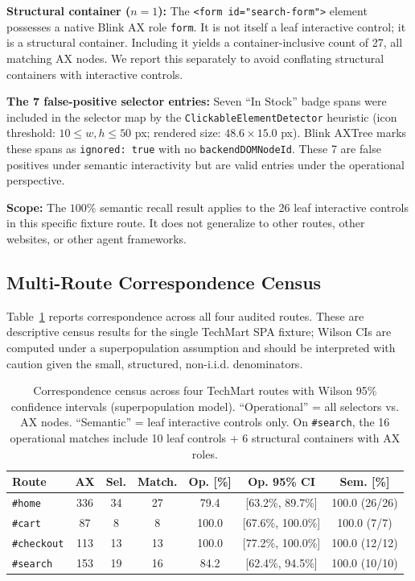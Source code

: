 \documentclass[conference]{IEEEtran}
\begin{document}
\textbf{Structural container ($n=1$):} The \texttt{<form id="search-form">} element possesses a native Blink AX role \texttt{form}. It is not itself a leaf interactive control; it is a structural container. Including it yields a container-inclusive count of 27, all matching AX nodes. We report this separately to avoid conflating structural containers with interactive controls.

\textbf{The 7 false-positive selector entries:} Seven ``In Stock'' badge spans were included in the selector map by the \texttt{ClickableElementDetector} heuristic (icon threshold: $10 \leq w, h \leq 50$ px; rendered size: $48.6 \times 15.0$ px). Blink AXTree marks these spans as \texttt{ignored: true} with no \texttt{backendDOMNodeId}. These 7 are false positives under semantic interactivity but are valid entries under the operational perspective.

\textbf{Scope:} The $100\%$ semantic recall result applies to the 26 leaf interactive controls in this specific fixture route. It does not generalize to other routes, other websites, or other agent frameworks.

\subsection{Multi-Route Correspondence Census}

Table~\ref{tab:multi_route} reports correspondence across all four audited routes. These are descriptive census results for the single TechMart SPA fixture; Wilson CIs are computed under a superpopulation assumption and should be interpreted with caution given the small, structured, non-i.i.d. denominators.

\begin{table}[t]
\centering
\footnotesize
\caption{Correspondence census across four TechMart routes with Wilson 95\% confidence intervals (superpopulation model). ``Operational'' = all selectors vs. AX nodes. ``Semantic'' = leaf interactive controls only. On \texttt{\#search}, the 16 operational matches include 10 leaf controls + 6 structural containers with AX roles.}
\label{tab:multi_route}
\begin{tabular}{lcccccc}
\toprule
\textbf{Route} & \textbf{AX} & \textbf{Sel.} & \textbf{Match.} & \textbf{Op. [\%]} & \textbf{Op. 95\% CI} & \textbf{Sem. [\%]} \\
\midrule
\texttt{\#home}     & 336 & 34 & 27 & 79.4 & [63.2\%, 89.7\%] & 100.0 (26/26) \\
\texttt{\#cart}     &  87 &  8 &  8 & 100.0 & [67.6\%, 100.0\%] & 100.0 (7/7) \\
\texttt{\#checkout} & 113 & 13 & 13 & 100.0 & [77.2\%, 100.0\%] & 100.0 (12/12) \\
\texttt{\#search}   & 153 & 19 & 16 & 84.2  & [62.4\%, 94.5\%] & 100.0 (10/10) \\
\bottomrule
\end{tabular}
\end{table}
\end{document}
